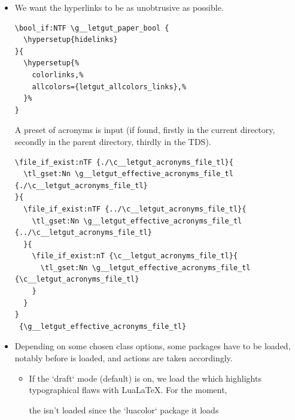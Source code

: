 \documentclass{letgut}
\begin{document}
\begin{itemize}
\item We want the hyperlinks to be as unobtrusive as possible.
\begin{lstlisting}
\bool_if:NTF \g__letgut_paper_bool {
  \hypersetup{hidelinks}
}{
  \hypersetup{%
    colorlinks,%
    allcolors={letgut_allcolors_links},%
  }%
}
\end{lstlisting}

A preset of acronyms is input (if found, firstly in the current directory,
secondly in the parent directory, thirdly in the TDS).
\begin{lstlisting}
\file_if_exist:nTF {./\c__letgut_acronyms_file_tl}{
  \tl_gset:Nn \g__letgut_effective_acronyms_file_tl {./\c__letgut_acronyms_file_tl}
}{
  \file_if_exist:nTF {../\c__letgut_acronyms_file_tl}{
    \tl_gset:Nn \g__letgut_effective_acronyms_file_tl {../\c__letgut_acronyms_file_tl}
  }{
    \file_if_exist:nT {\c__letgut_acronyms_file_tl}{
      \tl_gset:Nn \g__letgut_effective_acronyms_file_tl {\c__letgut_acronyms_file_tl}
    }
  }
}
 {\g__letgut_effective_acronyms_file_tl}
\end{lstlisting}

\item Depending on some chosen class options, some packages have to be loaded,
notably before  is loaded, and actions are taken
accordingly.
\begin{itemize}
\item If the `draft` mode (default) is on, we load the  which
highlights typographical flaws with LuaLaTeX. For the moment,

the  isn't loaded since  the `luacolor`
package it loads


\end{itemize}
\end{itemize}
\end{document}
